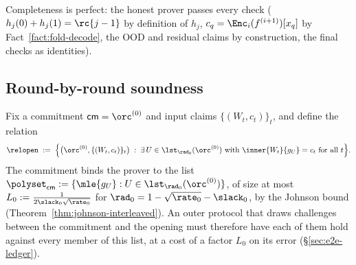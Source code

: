 Completeness is perfect: the honest prover passes every check ($h_j(0) + h_j(1) = \rc{j-1}$ by definition of $h_j$, $c_q = \Enc_i(f^{(i+1)})[x_q]$ by Fact~\ref{fact:fold-decode}, the OOD and residual claims by construction, the final checks as identities).

\subsection{Round-by-round soundness}\label{sec:soundness}

Fix a commitment $\mathsf{cm} = \orc^{(0)}$ and input claims $\{(W_t, c_t)\}_t$, and define the relation
\[
\relopen \;:=\; \Bigl\{ \bigl(\orc^{(0)}, \{(W_t, c_t)\}_t\bigr) \;:\; \exists\, U \in \lst_{\rad_0}(\orc^{(0)}) \text{ with } \inner{W_t}{g_U} = c_t \text{ for all } t \Bigr\}.
\]
The commitment binds the prover to the list $\polyset_{\mathsf{cm}} := \{\mle{g_U} : U \in \lst_{\rad_0}(\orc^{(0)})\}$, of size at most $L_0 := \tfrac{1}{2\slack_0\sqrt{\rate_0}}$ for $\rad_0 = 1 - \sqrt{\rate_0} - \slack_0$, by the Johnson bound (Theorem~\ref{thm:johnson-interleaved}). An outer protocol that draws challenges between the commitment and the opening must therefore have each of them hold against every member of this list, at a cost of a factor $L_0$ on its error (\S\ref{sec:e2e-ledger}).

